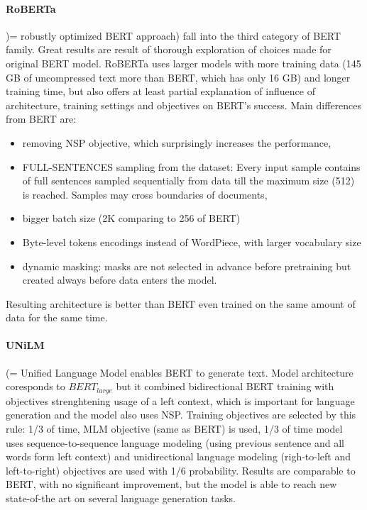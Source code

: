 \paragraph{RoBERTa} )= robustly optimized BERT approach) \citep{Liu2019} fall into the third category of BERT family. Great results are result of thorough exploration of choices made for original BERT model. RoBERTa uses larger models with more training data (145 GB of uncompressed text more than BERT, which has only 16 GB) and longer training time, but also offers at least partial explanation of influence of architecture, training settings and objectives on BERT's success. Main differences from BERT are:
\begin{itemize}
\item removing NSP objective, which surprisingly increases the performance,
\item FULL-SENTENCES sampling from the dataset: Every input sample contains of full sentences sampled sequentially from data till the maximum size (512) is reached.  Samples may cross boundaries of documents,
\item bigger batch size (2K comparing to 256 of BERT)
\item Byte-level tokens encodings instead of WordPiece, with larger vocabulary size
\item dynamic masking: masks are not selected in advance before pretraining but created always before data enters the model.
\end{itemize}
Resulting architecture is better than BERT even trained on the same amount of data for the same time.

\paragraph{UNiLM} (= Unified Language Model \citep{Dong2019} enables BERT to generate text. Model architecture coresponds to $BERT_{large}$ but it combined bidirectional BERT training with objectives strenghtening usage of a left context, which is important for language generation and the model also uses NSP. Training objectives are selected by this rule: 1/3 of time, MLM objective (same as BERT) is used, 1/3 of time model uses sequence-to-sequence language modeling (using previous sentence and all words form left context) and unidirectional language modeling (righ-to-left and left-to-right) objectives are used with 1/6 probability. Results are comparable to BERT, with no significant improvement, but the model is able to reach new state-of-the art on several language generation tasks.

